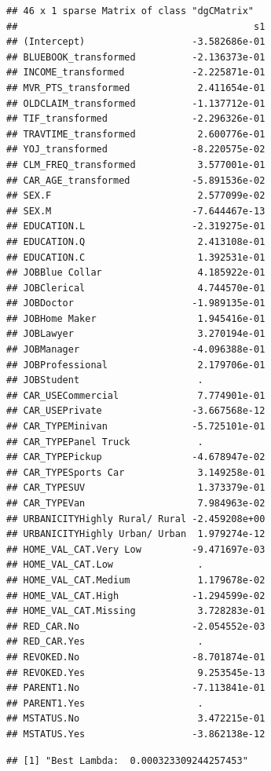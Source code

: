 \documentclass[
]{article}
\begin{document}
\begin{verbatim}
## 46 x 1 sparse Matrix of class "dgCMatrix"
##                                          s1
## (Intercept)                   -3.582686e-01
## BLUEBOOK_transformed          -2.136373e-01
## INCOME_transformed            -2.225871e-01
## MVR_PTS_transformed            2.411654e-01
## OLDCLAIM_transformed          -1.137712e-01
## TIF_transformed               -2.296326e-01
## TRAVTIME_transformed           2.600776e-01
## YOJ_transformed               -8.220575e-02
## CLM_FREQ_transformed           3.577001e-01
## CAR_AGE_transformed           -5.891536e-02
## SEX.F                          2.577099e-02
## SEX.M                         -7.644467e-13
## EDUCATION.L                   -2.319275e-01
## EDUCATION.Q                    2.413108e-01
## EDUCATION.C                    1.392531e-01
## JOBBlue Collar                 4.185922e-01
## JOBClerical                    4.744570e-01
## JOBDoctor                     -1.989135e-01
## JOBHome Maker                  1.945416e-01
## JOBLawyer                      3.270194e-01
## JOBManager                    -4.096388e-01
## JOBProfessional                2.179706e-01
## JOBStudent                     .           
## CAR_USECommercial              7.774901e-01
## CAR_USEPrivate                -3.667568e-12
## CAR_TYPEMinivan               -5.725101e-01
## CAR_TYPEPanel Truck            .           
## CAR_TYPEPickup                -4.678947e-02
## CAR_TYPESports Car             3.149258e-01
## CAR_TYPESUV                    1.373379e-01
## CAR_TYPEVan                    7.984963e-02
## URBANICITYHighly Rural/ Rural -2.459208e+00
## URBANICITYHighly Urban/ Urban  1.979274e-12
## HOME_VAL_CAT.Very Low         -9.471697e-03
## HOME_VAL_CAT.Low               .           
## HOME_VAL_CAT.Medium            1.179678e-02
## HOME_VAL_CAT.High             -1.294599e-02
## HOME_VAL_CAT.Missing           3.728283e-01
## RED_CAR.No                    -2.054552e-03
## RED_CAR.Yes                    .           
## REVOKED.No                    -8.701874e-01
## REVOKED.Yes                    9.253545e-13
## PARENT1.No                    -7.113841e-01
## PARENT1.Yes                    .           
## MSTATUS.No                     3.472215e-01
## MSTATUS.Yes                   -3.862138e-12
\end{verbatim}

\begin{verbatim}
## [1] "Best Lambda:  0.000323309244257453"
\end{verbatim}
\end{document}
